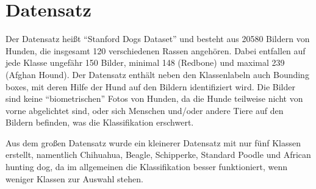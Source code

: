 \chapter{Datensatz}
\label{chap:datensatz}
Der Datensatz heißt \enquote{Stanford Dogs Dataset}\cite{datensatz} und besteht aus
20580 Bildern von Hunden, die insgesamt 120 verschiedenen Rassen angehören. Dabei
entfallen auf jede Klasse ungefähr 150 Bilder, minimal 148 (Redbone) und maximal
239 (Afghan Hound). Der Datensatz enthält neben den Klassenlabeln auch Bounding
boxes, mit deren Hilfe der Hund auf den Bildern identifiziert wird. Die Bilder sind
keine \enquote{biometrischen} Fotos von Hunden, da die Hunde teilweise nicht von vorne
abgelichtet sind, oder sich Menschen und/oder andere Tiere auf den Bildern befinden,
was die Klassifikation erschwert.

Aus dem großen Datensatz wurde ein kleinerer Datensatz mit nur fünf Klassen erstellt, namentlich
Chihuahua, Beagle, Schipperke, Standard Poodle und African hunting dog, da im allgemeinen
die Klassifikation besser funktioniert, wenn weniger Klassen zur Auswahl stehen.
